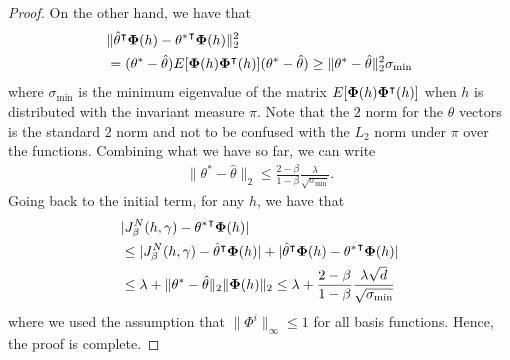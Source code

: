 \documentclass[letterpaper, 10 pt, conference]{ieeeconf}  %
\theoremstyle{definition}
\theoremstyle{remark}
\begin{document}
\begin{proof}
On the other hand, we have that 
\begin{align*}
&\| \hat{\theta}^\intercal {\bf \Phi}(h) -  {\theta^*}^\intercal {\bf \Phi}(h)\|^2_2\\
&= (\theta^* - \hat{\theta}) E[{\bf \Phi}(h) {\bf \Phi}^\intercal(h)  ] (\theta^*-\hat{\theta}) \geq  \|\theta^* - \hat{\theta}\|^2_2 \sigma_{\min}
\end{align*}
where $\sigma_{\min}$ is the minimum eigenvalue of the matrix $E[{\bf \Phi}(h) {\bf \Phi}^\intercal(h)  ] $ when $h$ is distributed with the invariant measure $\pi$. Note that the $2$ norm for the $\theta$ vectors is the standard $2$ norm and not to be confused with the $L_2$ norm under $\pi$ over the functions. Combining what we have so far, we can write
\begin{align*}
 \|\theta^* - \hat{\theta}\|_2 \leq \frac{2-\beta}{1-\beta}\frac{\lambda}{\sqrt{\sigma_{\min}}}.
\end{align*}
Going back to the initial term, for any $h$, we have that 
\begin{align*}
&|J_\beta^N(h,\gamma) - {\theta^*}^\intercal {\bf \Phi}(h)|\\
& \leq | J_\beta^N(h,\gamma) - \hat{\theta}^\intercal {\bf \Phi}(h)|+ | \hat{\theta}^\intercal {\bf \Phi}(h) -  {\theta^*}^\intercal {\bf \Phi}(h)|\\
&\leq \lambda +  \|\theta^* - \hat{\theta}\|_2  \| {\bf \Phi}(h)\|_2\leq \lambda +  \frac{2-\beta}{1-\beta}\frac{\lambda\sqrt{d}}{\sqrt{\sigma_{\min}}}
\end{align*}
where we used the assumption that $\|\Phi^i\|_\infty\leq 1$ for all basis functions. Hence, the proof is complete.
\end{proof}
\end{document}
